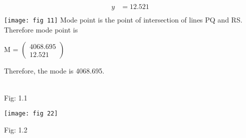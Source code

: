 \documentclass[12pt, a4paper] {article}
\begin{document}
\begin{multicols*}{2}
\begin{align*}
y &= 12.521 \\
\end{align*}
\texttt{[image: fig 11]}
Mode point is the point of intersection of lines PQ and RS.\\
Therefore mode point is\\
\begin{center}
M =
$\begin{pmatrix}
  4068.695\\
  12.521 
\end{pmatrix}$ 
\end{center}
Therefore, the mode is 4068.695.\\\\
\end{multicols*}
\begin{center}
Fig: 1.1\\
\end{center}
\texttt{[image: fig 22]}
\begin{center}
Fig: 1.2\\
\end{center}
\end{document}
